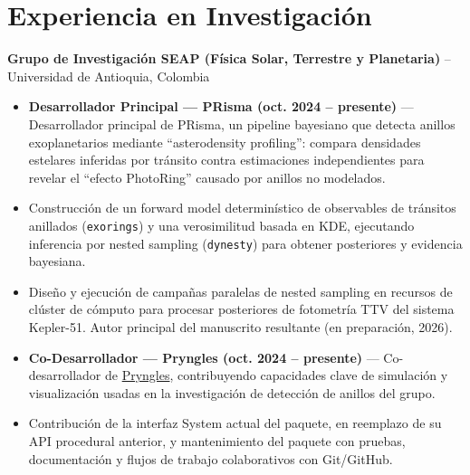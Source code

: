 \section*{Experiencia en Investigación}
\textbf{Grupo de Investigación SEAP (Física Solar, Terrestre y Planetaria)} -- Universidad de Antioquia, Colombia
\begin{itemize}
    \item \textbf{Desarrollador Principal — PRisma (oct. 2024 -- presente)} — Desarrollador principal de PRisma, un pipeline bayesiano que detecta anillos exoplanetarios mediante ``asterodensity profiling'': compara densidades estelares inferidas por tránsito contra estimaciones independientes para revelar el ``efecto PhotoRing'' causado por anillos no modelados.
    \item Construcción de un forward model determinístico de observables de tránsitos anillados (\texttt{exorings}) y una verosimilitud basada en KDE, ejecutando inferencia por nested sampling (\texttt{dynesty}) para obtener posteriores y evidencia bayesiana.
    \item Diseño y ejecución de campañas paralelas de nested sampling en recursos de clúster de cómputo para procesar posteriores de fotometría TTV del sistema Kepler-51. Autor principal del manuscrito resultante (en preparación, 2026).
    \item \textbf{Co-Desarrollador — Pryngles (oct. 2024 -- presente)} — Co-desarrollador de \href{https://github.com/seap-udea/pryngles}{Pryngles}, contribuyendo capacidades clave de simulación y visualización usadas en la investigación de detección de anillos del grupo.
    \item Contribución de la interfaz System actual del paquete, en reemplazo de su API procedural anterior, y mantenimiento del paquete con pruebas, documentación y flujos de trabajo colaborativos con Git/GitHub.
\end{itemize}
